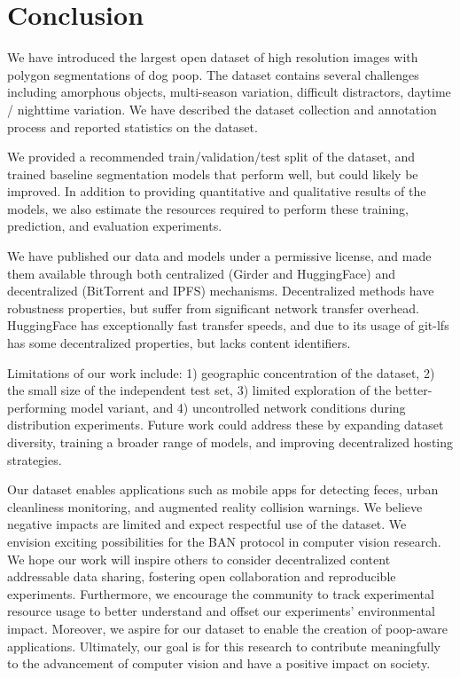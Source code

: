 \documentclass{article}
\begin{document}
\section{Conclusion}

We have introduced the largest open dataset of high resolution images with polygon
  segmentations of dog poop.
The dataset contains several challenges including amorphous objects, multi-season variation, difficult
  distractors, daytime / nighttime variation.
We have described the dataset collection and annotation process and reported statistics on the dataset.

We provided a recommended train/validation/test split of the dataset, and trained baseline segmentation
  models that perform well, but could likely be improved.
In addition to providing quantitative and qualitative results of the models, we also estimate the resources
  required to perform these training, prediction, and evaluation experiments.

We have published our data and models under a permissive license, and made them available through both
  centralized (Girder and HuggingFace) and decentralized (BitTorrent and IPFS) mechanisms.
Decentralized methods have robustness properties, but suffer from significant network transfer overhead.
HuggingFace has exceptionally fast transfer speeds, and due to its usage of git-lfs has some decentralized
  properties, but lacks content identifiers.


Limitations of our work include:
1) geographic concentration of the dataset,
2) the small size of the independent test set,
3) limited exploration of the better-performing model variant, and
4) uncontrolled network conditions during distribution experiments.
Future work could address these by expanding dataset diversity, training a
broader range of models, and improving decentralized hosting strategies.

Our dataset enables applications such as mobile apps for detecting feces, urban
cleanliness monitoring, and augmented reality collision warnings. We believe
negative impacts are limited and expect respectful use of the dataset.
We envision exciting possibilities for the BAN protocol in computer vision research.
We hope our work will inspire others to consider decentralized content addressable data sharing, fostering
  open collaboration and reproducible experiments.
Furthermore, we encourage the community to track experimental resource usage to better understand and offset
  our experiments' environmental impact.
Moreover, we aspire for our dataset to enable the creation of poop-aware applications.
Ultimately, our goal is for this research to contribute meaningfully to the advancement of computer vision
  and have a positive impact on society.
  
\end{document}
